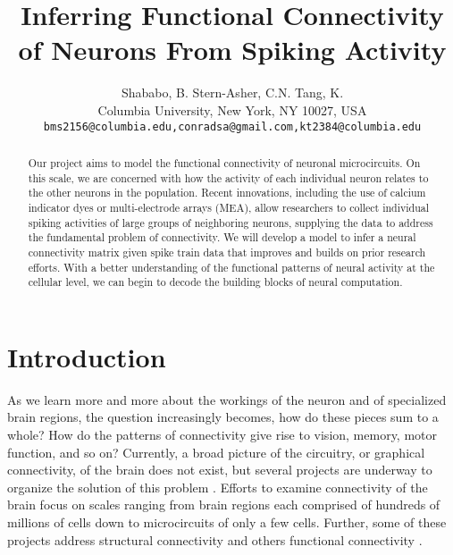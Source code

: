 \documentclass{article}
\title{Inferring Functional Connectivity of Neurons From Spiking Activity}
\author{
Shababo, B. \hspace{1cm} Stern-Asher, C.N. \hspace{1cm} Tang, K.\\
Columbia University, New York, NY 10027, USA \\
\texttt{bms2156@columbia.edu,conradsa@gmail.com,kt2384@columbia.edu}
}
\begin{document}
\maketitle

\begin{abstract}
Our project aims to model the functional connectivity of neuronal
microcircuits. On this scale, we are concerned with how the activity
of each individual neuron relates to the other neurons in the
population. Recent innovations, including the use of calcium indicator
dyes or multi-electrode arrays (MEA), allow researchers to collect
individual spiking activities of large groups of neighboring neurons,
supplying the data to address the fundamental problem of connectivity.
We will develop a model to infer a neural connectivity matrix given
spike train data that improves and builds on prior research efforts.
With a better understanding of the functional patterns of neural
activity at the cellular level, we can begin to decode the building
blocks of neural computation.
\end{abstract}

\section{Introduction}
\label{sec:introduction}

As we learn more and more about the workings of the neuron and of
specialized brain regions, the question increasingly becomes, how
do these pieces sum to a whole? How do the patterns of connectivity
give rise to vision, memory, motor function, and so on? Currently, a broad picture of the circuitry, or graphical connectivity,
of the brain does not exist, but several projects are underway to organize the solution of
this problem \citep{Marcus2011, Bohland2009}. Efforts to examine connectivity of the brain focus on scales ranging from brain regions each comprised of hundreds of
millions of cells down to microcircuits of only a few cells. Further,
some of these projects address structural connectivity and others
functional connectivity \citep{KnowlesBarley2011, Jain2010, Ropireddy2011, Chiang2011, bhattacharya2006}.
\end{document}
